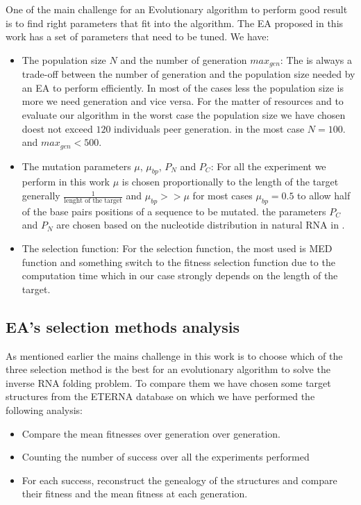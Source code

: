\documentclass[english,12pt,a4paper]{article}
\theoremstyle{definition}
\begin{document}
One of the main challenge for an Evolutionary algorithm to perform good result is to find right parameters that fit into the algorithm. The EA proposed in this work  has a set of parameters that need to be tuned. We have: 
\begin{itemize}
	\item The population size $N$ and the number of generation $max_{gen}$: The is always a trade-off between the number of generation and the population size needed by an EA to perform efficiently. In most of the cases less the population size is more we need generation and vice versa. For the matter of resources and to evaluate our algorithm in the worst case the population size we have chosen doest not exceed  $120$ individuals peer generation. in the most case $N = 100$. and $max_{gen} < 500$. 
	\item The mutation parameters $\mu$, $\mu_{bp}$, $P_N$ and $P_C$: For all the experiment we perform in this work $\mu$ is chosen proportionally to the length of the target generally $\frac{1}{\text{lenght of the target}}$  and $\mu_{bp}>>\mu$ for most cases $\mu_{bp} = 0.5$ to allow half of the base pairs positions of a sequence to be mutated. the parameters $P_C$ and $P_N$ are chosen based on the nucleotide distribution in natural RNA in \cite{esmaili2015erd}.
	\item The selection function: For the selection function, the most used is MED function and something switch to the fitness selection function due to the computation time which in our case strongly depends on the length of the target. 
\end{itemize}


\subsection{EA's selection methods analysis}
As mentioned earlier the mains challenge in this work is to choose which of the three selection method is the best for an evolutionary algorithm to solve the inverse RNA folding problem. To compare them we have chosen some target structures from the ETERNA database on which we have performed the following analysis: 

\begin{itemize}
	\item Compare the mean fitnesses over generation over generation.
	\item Counting the number of success over all the experiments performed
	\item For each success, reconstruct the genealogy of the structures and compare their fitness and the mean fitness at  each generation. 
	
\end{itemize}
\end{document}
